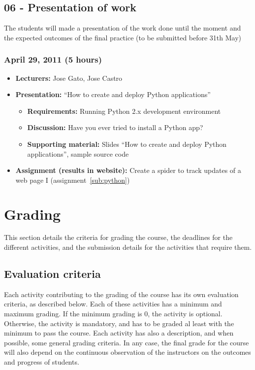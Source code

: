 \documentclass[a4paper]{article}
\begin{document}
\subsection{06 - Presentation of work}

The students will made a presentation of the work done until the moment and the expected outcomes of the final practice (to be submitted before 31th May)

\subsubsection{April 29, 2011 (5 hours)}

\begin{itemize}
\item \textbf{Lecturers:} Jose Gato, Jose Castro
\item \textbf{Presentation:} ``How to create and deploy Python applications''
  \begin{itemize}
\item \textbf{Requirements:} Running Python 2.x development environment
  \item \textbf{Discussion:} Have you ever tried to install a Python app?
  \item \textbf{Supporting material:} Slides ``How to create and
    deploy Python applications'', sample source code
  \end{itemize}
\item \textbf{Assignment (results in website):} Create a spider to
  track updates of a web page I (assignment~\ref{sub:python})
\end{itemize}





\section{Grading}

This section details the criteria for grading the course, the
deadlines for the different activities, and the submission details for
the activities that require them.

\subsection{Evaluation criteria}
\label{sub:evaluation-criteria}

Each activity contributing to the grading of the course has its own
evaluation criteria, as described below. Each of these activities has
a minimum and maximum grading. If the minimum grading is 0, the
activity is optional. Otherwise, the activity is mandatory, and has to
be graded al least with the minimum to pass the course. Each activity
has also a description, and when possible, some general grading
criteria. In any case, the final grade for the course will also depend
on the continuous observation of the instructors on the outcomes and
progress of students.
\end{document}

